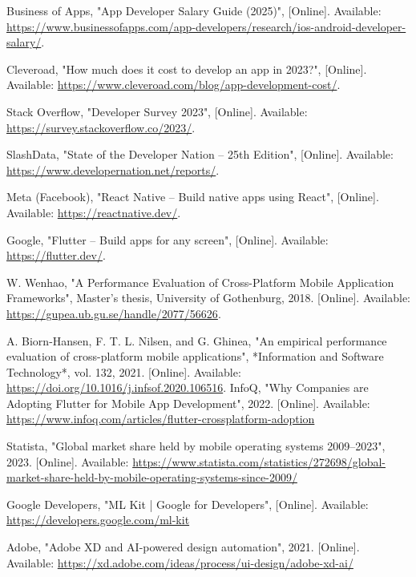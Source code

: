 \documentclass[12pt]{report}
\begin{document}
\begin{thebibliography}{1}
    Business of Apps, "App Developer Salary Guide (2025)", [Online]. Available: \url{https://www.businessofapps.com/app-developers/research/ios-android-developer-salary/}.

    Cleveroad, "How much does it cost to develop an app in 2023?", [Online]. Available: \url{https://www.cleveroad.com/blog/app-development-cost/}.
    
    Stack Overflow, "Developer Survey 2023", [Online]. Available: \url{https://survey.stackoverflow.co/2023/}.
    
    SlashData, "State of the Developer Nation – 25th Edition", [Online]. Available: \url{https://www.developernation.net/reports/}.
    
    Meta (Facebook), "React Native – Build native apps using React", [Online]. Available: \url{https://reactnative.dev/}.
    
    Google, "Flutter – Build apps for any screen", [Online]. Available: \url{https://flutter.dev/}.
    
    W. Wenhao, "A Performance Evaluation of Cross-Platform Mobile Application Frameworks", Master’s thesis, University of Gothenburg, 2018. [Online]. Available: \url{https://gupea.ub.gu.se/handle/2077/56626}.
    
    A. Biorn-Hansen, F. T. L. Nilsen, and G. Ghinea, "An empirical performance evaluation of cross-platform mobile applications", *Information and Software Technology*, vol. 132, 2021. [Online]. Available: \url{https://doi.org/10.1016/j.infsof.2020.106516}.
InfoQ, "Why Companies are Adopting Flutter for Mobile App Development", 2022. [Online]. Available: \url{https://www.infoq.com/articles/flutter-crossplatform-adoption}

Statista, "Global market share held by mobile operating systems 2009–2023", 2023. [Online]. Available: \url{https://www.statista.com/statistics/272698/global-market-share-held-by-mobile-operating-systems-since-2009/}

Google Developers, "ML Kit | Google for Developers", [Online]. Available: \url{https://developers.google.com/ml-kit}

Adobe, "Adobe XD and AI-powered design automation", 2021. [Online]. Available: \url{https://xd.adobe.com/ideas/process/ui-design/adobe-xd-ai/}


\end{thebibliography}
\end{document}

